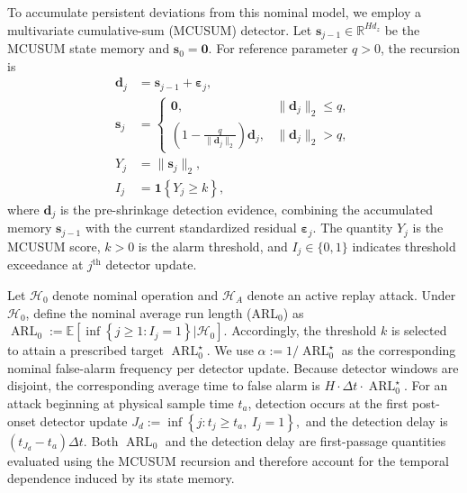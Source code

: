 \documentclass[letterpaper, 10 pt, conference]{ieeeconf}
\theoremstyle{plain}
\begin{document}
To accumulate persistent deviations from this nominal model, we employ a multivariate cumulative-sum (MCUSUM) detector. Let $\mathbf{s}_{j-1}\in\mathbb{R}^{Hd_z}$ be the MCUSUM state memory and $\mathbf{s}_0=\mathbf{0}$. For reference parameter $q>0$, the recursion is
\begin{align}
    \mathbf{d}_j &= \mathbf{s}_{j-1}+\pmb{\varepsilon}_j,
    \label{eq:mcusum_dt}\\
    \mathbf{s}_j &=
    \begin{cases}
        \mathbf{0}, & \|\mathbf{d}_j\|_2\le q,\\
        \displaystyle
        \left(1-\frac{q}{\|\mathbf{d}_j\|_2}\right) \mathbf{d}_j, & \|\mathbf{d}_j\|_2>q,
    \end{cases}
    \label{eq:mcusum_st}\\
    Y_j &= \|\mathbf{s}_j\|_2, \label{eq:mcusum_score}\\
    I_j &= \mathbf{1}\left\{Y_j\ge k\right\}, \label{eq:mcusum_alarm}
\end{align}
where $\mathbf{d}_j$ is the pre-shrinkage detection evidence, combining the accumulated memory $\mathbf{s}_{j-1}$ with the current standardized residual $\pmb{\varepsilon}_j$. The quantity $Y_j$ is the MCUSUM score, $k>0$ is the alarm threshold, and $I_j\in\{0,1\}$ indicates threshold exceedance at $j^{\text{th}}$ detector update. \

Let $\mathcal{H}_0$ denote nominal operation and $\mathcal{H}_A$ denote an active replay attack. Under $\mathcal{H}_0$, define the nominal average run length (ARL$_0$) as $\operatorname{ARL}_0:=\mathbb{E}\left[\inf\left\{j\geq 1:I_j=1\right\} \big| \mathcal{H}_0\right]$. Accordingly, the threshold $k$ is selected to attain a prescribed target $\operatorname{ARL}_0^\star$. We use $\alpha:=1/\operatorname{ARL}_0^\star$ as the corresponding nominal false-alarm frequency per detector update. Because detector windows are disjoint, the corresponding average time to false alarm is $H \cdot \Delta t \cdot \operatorname{ARL}_0^\star$. For an attack beginning at physical sample time $t_a$, detection occurs at the first post-onset detector update $J_d:=\inf\left\{j:t_j\geq t_a,\ I_j=1\right\},$ and the detection delay is $(t_{J_d}-t_a)\Delta t$. Both $\operatorname{ARL}_0$ and the detection delay are first-passage quantities evaluated using the MCUSUM recursion and therefore account for the temporal dependence induced by its state memory.
\end{document}
